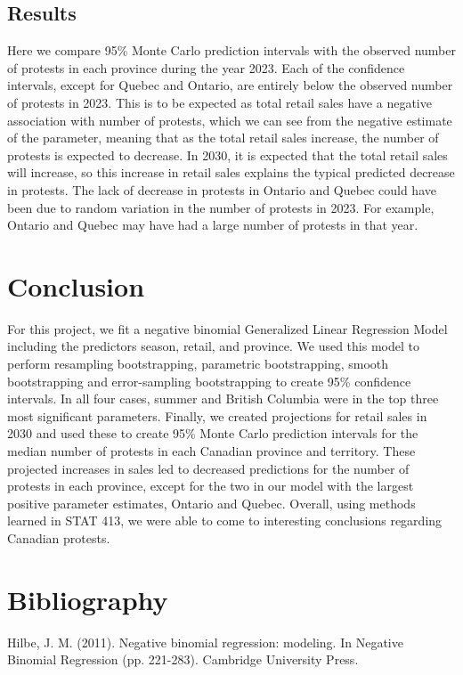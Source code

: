 \documentclass[12pt]{article}
\begin{document}
\subsection*{Results}
Here we compare 95\% Monte Carlo prediction intervals with the observed number of protests in each province during the year 2023. Each of the confidence intervals, except for Quebec and Ontario, are entirely below the observed number of protests in 2023. This is to be expected as total retail sales have a negative association with number of protests, which we can see from the negative estimate of the parameter, meaning that as the total retail sales increase, the number of protests is expected to decrease. In 2030, it is expected that the total retail sales will increase, so this increase in retail sales explains the typical predicted decrease in protests. The lack of decrease in protests in Ontario and Quebec could have been due to random variation in the number of protests in 2023. For example, Ontario and Quebec may have had a large number of protests in that year.




\newpage
\section{Conclusion}
For this project, we fit a negative binomial Generalized Linear Regression Model including the predictors season, retail, and province. We used this model to perform resampling bootstrapping, parametric bootstrapping, smooth bootstrapping and error-sampling bootstrapping to create 95\% confidence intervals. In all four cases, summer and British Columbia were in the top three most significant parameters. Finally, we created projections for retail sales in 2030 and used these to create 95\% Monte Carlo prediction intervals for the median number of protests in each Canadian province and territory. These projected increases in sales led to decreased predictions for the number of protests in each province, except for the two in our model with the largest positive parameter estimates, Ontario and Quebec.
Overall, using methods learned in STAT 413, we were able to come to interesting conclusions regarding Canadian protests.

\newpage
\section*{Bibliography}

\hspace{0.6cm}Hilbe, J. M. (2011). Negative binomial regression: modeling. In Negative Binomial Regression (pp. 221-283). Cambridge University Press.
\vspace{0.5cm}
\end{document}
